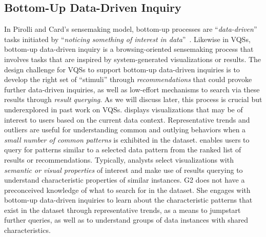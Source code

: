 {  \subsection{Bottom-Up Data-Driven Inquiry}%
  In Pirolli and Card's sensemaking model, bottom-up processes are ``\textit{data-driven}'' tasks initiated by ``\textit{noticing something of interest in data}''~\cite{Pirolli}. Likewise in VQSs, bottom-up data-driven inquiry is a browsing-oriented sensemaking process that involves tasks that are inspired by system-generated visualizations or results. The design challenge for VQSs to support bottom-up data-driven inquiries is to develop the right set of ``stimuli'' through \textit{recommendations} that could provoke further data-driven inquiries, as well as low-effort mechanisms to search via these results through \textit{result querying}. As we will discuss later, this process is crucial but underexplored in past work on VQSs. %
   displays visualizations that may be of interest to users based on the current data context. Representative trends and outliers are useful for understanding common and outlying behaviors when a \emph{small number of common patterns} is exhibited in the dataset. %
   enables users to query for patterns similar to a selected data pattern from the ranked list of results or recommendations. Typically, analysts select visualizations with \emph{semantic or visual properties} of interest and make use of results querying to understand characteristic properties of similar instances.
   G2 does not have a preconceived knowledge of what to search for in the dataset. She engages with bottom-up data-driven inquiries to learn about the characteristic patterns that exist in the dataset through representative trends, as a means to jumpstart further queries, as well as to understand groups of data instances with shared characteristics.
}
